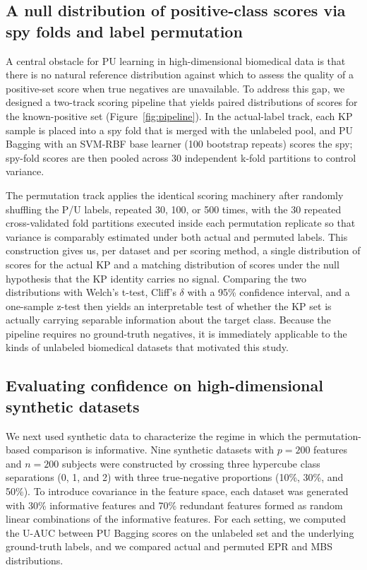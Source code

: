 \documentclass[11pt]{article}
\begin{document}
\subsection{A null distribution of positive-class scores via spy folds and label permutation}

A central obstacle for PU learning in high-dimensional biomedical data is that there is no natural reference distribution against which to assess the quality of a positive-set score when true negatives are unavailable. To address this gap, we designed a two-track scoring pipeline that yields paired distributions of scores for the known-positive set (Figure~\ref{fig:pipeline}). In the actual-label track, each KP sample is placed into a spy fold that is merged with the unlabeled pool, and PU Bagging with an SVM-RBF base learner (100 bootstrap repeats) scores the spy; spy-fold scores are then pooled across 30 independent k-fold partitions to control variance.

The permutation track applies the identical scoring machinery after randomly shuffling the P/U labels, repeated 30, 100, or 500 times, with the 30 repeated cross-validated fold partitions executed inside each permutation replicate so that variance is comparably estimated under both actual and permuted labels. This construction gives us, per dataset and per scoring method, a single distribution of scores for the actual KP and a matching distribution of scores under the null hypothesis that the KP identity carries no signal. Comparing the two distributions with Welch's t-test, Cliff's $\delta$ with a 95\% confidence interval, and a one-sample z-test then yields an interpretable test of whether the KP set is actually carrying separable information about the target class. Because the pipeline requires no ground-truth negatives, it is immediately applicable to the kinds of unlabeled biomedical datasets that motivated this study.

\subsection{Evaluating confidence on high-dimensional synthetic datasets}

We next used synthetic data to characterize the regime in which the permutation-based comparison is informative. Nine synthetic datasets with $p = 200$ features and $n = 200$ subjects were constructed by crossing three hypercube class separations (0, 1, and 2) with three true-negative proportions (10\%, 30\%, and 50\%). To introduce covariance in the feature space, each dataset was generated with 30\% informative features and 70\% redundant features formed as random linear combinations of the informative features. For each setting, we computed the U-AUC between PU Bagging scores on the unlabeled set and the underlying ground-truth labels, and we compared actual and permuted EPR and MBS distributions.
\end{document}
